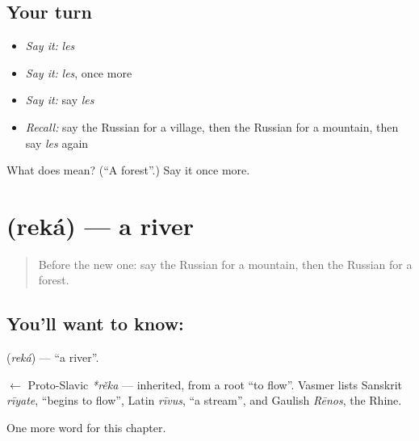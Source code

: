 \subsection*{Your turn}
\begin{itemize}
\raggedright
  \item \emph{Say it:} \emph{les}
  \item \emph{Say it:} \emph{les}, once more
  \item \emph{Say it:} say \emph{les}
  \item \emph{Recall:} say the Russian for a village, then the Russian for a mountain, then say \emph{les} again
\end{itemize}

\begin{tcolorbox}[breakable,colback=teal!4,colframe=teal!35!black,title={Before you move on}]
What does  mean? (\textquotedblleft{}A forest\textquotedblright{}.) Say it once more.
\end{tcolorbox}
\section[\texorpdfstring{\ru{река} (reká)}{река (reká)}]{ (reká) — a river}

\label{lesson:RU-C56-river}



\begin{quote}
Before the new one: say the Russian for a mountain, then the Russian for a forest.
\end{quote}

\subsection*{You'll want to know: }
\textbf{} (\emph{reká}) — \textquotedblleft{}a river\textquotedblright{}.

\begin{cousinweb}
\textbf{} $\leftarrow$ Proto-Slavic \emph{*rěka} — inherited, from a root \textquotedblleft{}to flow\textquotedblright{}. Vasmer lists Sanskrit \emph{rīyate}, \textquotedblleft{}begins to flow\textquotedblright{}, Latin \emph{rīvus}, \textquotedblleft{}a stream\textquotedblright{}, and Gaulish \emph{Rēnos}, the Rhine.
\end{cousinweb}

\begin{grammarlens}[title={What you've built}]
One more word for this chapter.
\end{grammarlens}

